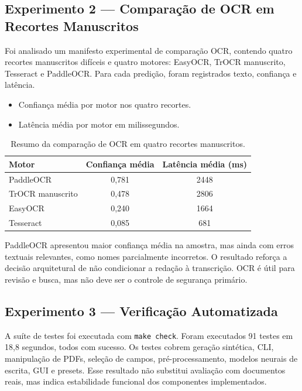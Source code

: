 \documentclass[12pt,a4paper]{article}
\begin{document}
\subsection{Experimento 2 — Comparação de OCR em Recortes Manuscritos}

Foi analisado um manifesto experimental de comparação OCR, contendo quatro recortes manuscritos difíceis e quatro motores: EasyOCR, TrOCR manuscrito, Tesseract e PaddleOCR. Para cada predição, foram registrados texto, confiança e latência.

\begin{itemize}
    \item{} Confiança média por motor nos quatro recortes.
    \item{} Latência média por motor em milissegundos.
\end{itemize}

\begin{table}[H]
    \centering
    \caption{Resumo da comparação de OCR em quatro recortes manuscritos.}
    \begin{tabular}{lcc}
        \toprule
        \textbf{Motor} & \textbf{Confiança média} & \textbf{Latência média (ms)} \\
        \midrule
        PaddleOCR & 0,781 & 2448 \\
        TrOCR manuscrito & 0,478 & 2806 \\
        EasyOCR & 0,240 & 1664 \\
        Tesseract & 0,085 & 681 \\
        \bottomrule
    \end{tabular}
    \label{tab:ocr}
\end{table}

PaddleOCR apresentou maior confiança média na amostra, mas ainda com erros textuais relevantes, como nomes parcialmente incorretos. O resultado reforça a decisão arquitetural de não condicionar a redação à transcrição. OCR é útil para revisão e busca, mas não deve ser o controle de segurança primário.

\subsection{Experimento 3 — Verificação Automatizada}

A suíte de testes foi executada com \texttt{make check}. Foram executados 91 testes em 18,8 segundos, todos com sucesso. Os testes cobrem geração sintética, CLI, manipulação de PDFs, seleção de campos, pré-processamento, modelos neurais de escrita, GUI e presets. Esse resultado não substitui avaliação com documentos reais, mas indica estabilidade funcional dos componentes implementados.
\end{document}
